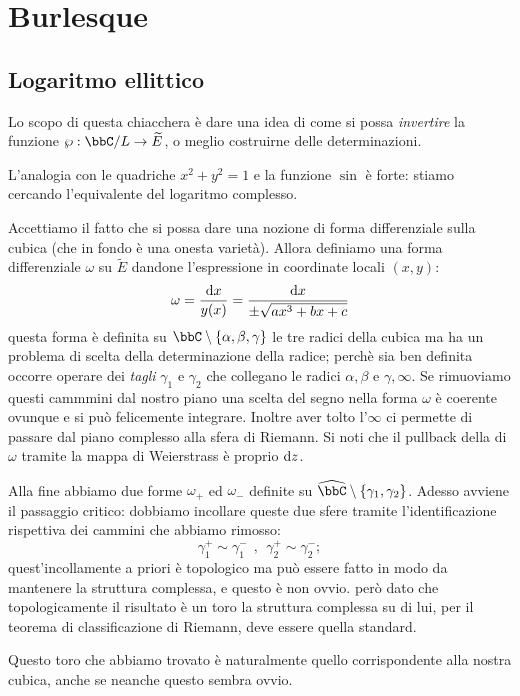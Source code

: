 \chapter{Burlesque}

\section{Logaritmo ellittico}
Lo scopo di questa chiacchera è dare una idea di come si possa {\it invertire} la funzione $\wp: \bbC/L \rar \widetilde{E}$, o meglio costruirne delle determinazioni.

L'analogia con le quadriche $x^2+y^2=1$ e la funzione $\sin$ è forte: stiamo cercando l'equivalente del logaritmo complesso.

Accettiamo il fatto che si possa dare una nozione di forma differenziale sulla cubica (che in fondo è una onesta varietà). Allora definiamo una forma differenziale $\omega$ su $\widetilde{E}$ dandone l'espressione in coordinate locali $(x,y)$:
$$
\omega=\frac{\text{d} x}{y(x)}=\frac{\text{d} x}{\pm\sqrt{ax^3+bx+c}}
$$
questa forma è definita su $\bbC\setminus\{\alpha, \beta, \gamma\}$ le tre radici della cubica ma ha un problema di scelta della determinazione della radice; perchè sia ben definita occorre operare dei {\it tagli} $\gamma_1$ e $\gamma_2$ che collegano le radici $\alpha,\beta$ e $\gamma,\infty$. Se rimuoviamo questi cammmini dal nostro piano una scelta del segno nella forma $\omega$ è coerente ovunque e si può felicemente integrare. Inoltre aver tolto l'$\infty$ ci permette di passare dal piano complesso alla sfera di Riemann.
Si noti che il pullback della di $\omega$ tramite la mappa di Weierstrass è proprio $\text{d} z$.

Alla fine abbiamo due forme $\omega_+$ ed $\omega_-$ definite su $\widehat{\bbC}\setminus\{\gamma_1,\gamma_2\}$. Adesso avviene il passaggio critico: dobbiamo incollare queste due sfere tramite l'identificazione rispettiva dei cammini che abbiamo rimosso:
$$
\gamma_1^+\sim \gamma_1^-\ \ , \ \ \gamma_2^+\sim\gamma_2^-;
$$
quest'incollamente a priori è topologico ma può essere fatto in modo da mantenere la struttura complessa, e questo è non ovvio. però dato che topologicamente il risultato è un toro la struttura complessa su di lui, per il teorema di classificazione di Riemann, deve essere quella standard.

Questo toro che abbiamo trovato è naturalmente quello corrispondente alla nostra cubica, anche se neanche questo sembra ovvio.

